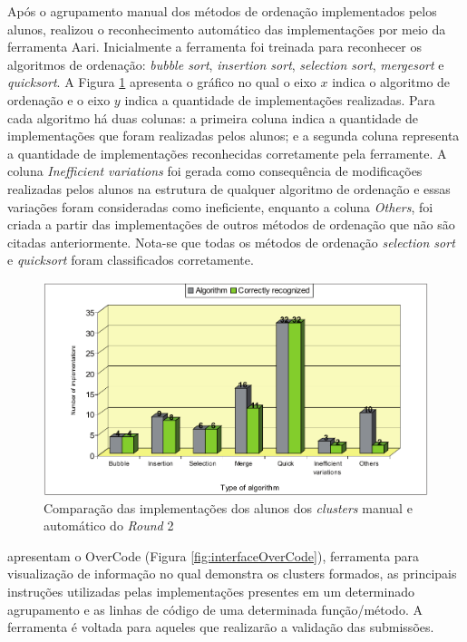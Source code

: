     Após o agrupamento manual dos métodos de ordenação implementados pelos alunos,
     realizou o reconhecimento automático das
    implementações por meio da ferramenta Aari. Inicialmente a ferramenta foi
    treinada para reconhecer os algoritmos de ordenação: \textit{bubble sort},
    \textit{insertion sort}, \textit{selection sort}, \textit{mergesort} e
    \textit{quicksort}. A Figura \ref{fig:clusterAutomatico} apresenta o gráfico
    no qual o eixo $x$ indica o algoritmo de ordenação e o eixo $y$  indica a
    quantidade de implementações realizadas. Para cada algoritmo há duas colunas:
    a primeira coluna indica a quantidade de implementações que foram realizadas
    pelos alunos; e a segunda coluna representa a quantidade de implementações
    reconhecidas corretamente pela ferramente. A coluna \textit{Inefficient variations}
    foi gerada como consequência de modificações realizadas pelos alunos na
    estrutura de qualquer algoritmo de ordenação e essas variações foram
    consideradas como ineficiente, enquanto a coluna \textit{Others}, foi
    criada a partir das implementações de outros métodos de ordenação que
    não são citadas anteriormente. Nota-se que todas os métodos de ordenação
    \textit{selection sort} e \textit{quicksort} foram classificados corretamente.
    
    \begin{figure}[ht]
        \centering
        \includegraphics[scale=0.33]{imagem/clusterAutomatico.png}
        \caption{Comparação das implementações dos alunos dos \textit{clusters}
        	manual e automático do \textit{Round} 2}
        \label{fig:clusterAutomatico}
    \end{figure}
    
     apresentam o OverCode (Figura \ref{fig:interfaceOverCode}),
    ferramenta para visualização de informação no qual demonstra os clusters formados,
    as principais instruções utilizadas pelas implementações presentes em um
    determinado agrupamento e as linhas de código de uma determinada função/método.
    A ferramenta é voltada para aqueles que realizarão a validação das submissões.
    

